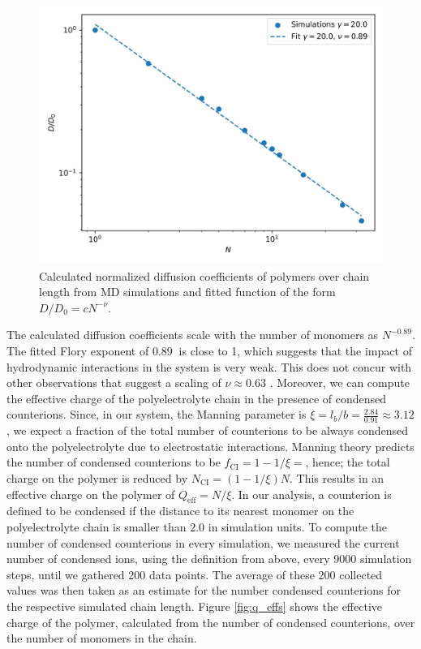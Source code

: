 \begin{figure}[H]
	\includegraphics[width=\columnwidth]{Analysis_1/diffusion_coefficients}
	\captionsetup{width=\columnwidth}
	\caption{Calculated normalized diffusion coefficients of polymers over chain length from MD simulations and fitted function of the form $D/D_0 = c N^{-\nu}$.}
	\label{fig:diff_coeff}
\end{figure}
The calculated diffusion coefficients scale with the number of monomers as $N^{-0.89}$. The fitted Flory exponent of $\SI{0.89}{}$ is close to 1, which suggests that the impact of hydrodynamic interactions in the system is very weak. This does not concur with other observations that suggest a scaling of $\nu \approx 0.63$ \cite{grass2008importance}.
Moreover, we can compute the effective charge of the polyelectrolyte chain in the presence of condensed counterions. Since, in our system, the Manning parameter is $\xi = l_b / b = \frac{2.84}{0.91} \approx 3.12$, we expect a fraction of the total number of counterions to be always condensed onto the polyelectrolyte due to electrostatic interactions. Manning theory predicts the number of condensed counterions to be $f_\text{CI} = 1 - 1/\xi = $, hence; the total charge on the polymer is reduced by $N_\text{CI} = (1-1/\xi)N$. This results in an effective charge on the polymer of $Q_\text{eff} = N/\xi$. In our analysis, a counterion is defined to be condensed if the distance to its nearest monomer on the polyelectrolyte chain is smaller than $2.0$ in simulation units. To compute the number of condensed counterions in every simulation, we measured the current number of condensed ions, using the definition from above, every 9000 simulation steps, until we gathered 200 data points. The average of these 200 collected values was then taken as an estimate for the number condensed counterions for the respective simulated chain length. Figure \ref{fig:q_effs} shows the effective charge of the polymer, calculated from the number of condensed counterions, over the number of monomers in the chain.
